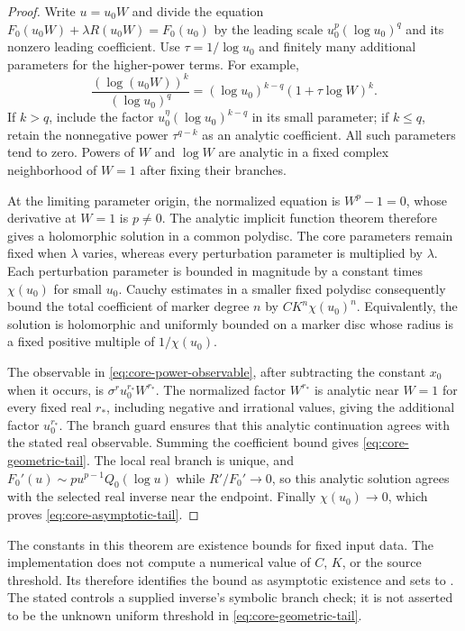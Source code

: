 \begin{proof}
Write $u=u_0W$ and divide the equation
$F_0(u_0W)+\lambda R(u_0W)=F_0(u_0)$ by the leading scale
$u_0^p(\log u_0)^q$ and its nonzero leading coefficient.
Use $\tau=1/\log u_0$ and finitely many additional parameters for the
higher-power terms. For example,
\[
 \frac{(\log(u_0W))^k}{(\log u_0)^q}
 =(\log u_0)^{k-q}(1+\tau\log W)^k.
\]
If $k>q$, include the factor
$u_0^\eta(\log u_0)^{k-q}$ in its small parameter; if $k\le q$,
retain the nonnegative power $\tau^{q-k}$ as an analytic coefficient.
All such parameters tend to zero. Powers of $W$ and $\log W$ are analytic
in a fixed complex neighborhood of $W=1$ after fixing their branches.

At the limiting parameter origin, the normalized equation is $W^p-1=0$,
whose derivative at $W=1$ is $p\ne0$. The analytic implicit function theorem
therefore gives a holomorphic solution in a common polydisc. The core
parameters remain fixed when $\lambda$ varies, whereas every perturbation
parameter is multiplied by $\lambda$. Each perturbation parameter is
bounded in magnitude by a constant times $\chi(u_0)$ for small $u_0$.
Cauchy estimates in a smaller fixed polydisc consequently bound the total
coefficient of marker degree $n$ by $C K^n\chi(u_0)^n$. Equivalently,
the solution is holomorphic and uniformly bounded on a marker disc whose
radius is a fixed positive multiple of $1/\chi(u_0)$.

The observable in \eqref{eq:core-power-observable}, after subtracting the
constant $x_0$ when it occurs, is $\sigma^r u_0^{r_*}W^{r_*}$.
The normalized factor $W^{r_*}$ is analytic near $W=1$ for every fixed
real $r_*$, including negative and irrational values, giving the additional
factor $u_0^{r_*}$. The branch guard ensures that this analytic continuation
agrees with the stated real observable. Summing the coefficient bound gives
\eqref{eq:core-geometric-tail}. The local real branch is unique, and
$F_0'(u)\sim p u^{p-1}Q_0(\log u)$ while $R'/F_0'\to0$,
so this analytic solution agrees with the selected real inverse near the
endpoint. Finally $\chi(u_0)\to0$, which proves
\eqref{eq:core-asymptotic-tail}.
\end{proof}

The constants in this theorem are existence bounds for fixed input data.
The implementation does not compute a numerical value of $C$, $K$, or the
source threshold. Its  therefore identifies the
bound as asymptotic existence and sets  to
. The stated  controls a supplied inverse's
symbolic branch check; it is not asserted to be the unknown uniform
threshold in \eqref{eq:core-geometric-tail}.

